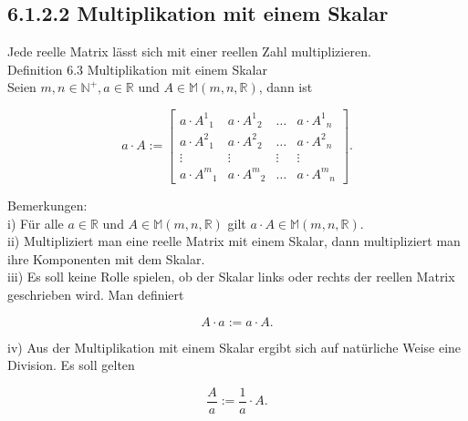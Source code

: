 \documentclass[10pt]{article}
\begin{document}
\subsection*{6.1.2.2 Multiplikation mit einem Skalar}
Jede reelle Matrix lässt sich mit einer reellen Zahl multiplizieren.\\
Definition 6.3 Multiplikation mit einem Skalar\\
Seien $m, n \in \mathbb{N}^{+}, a \in \mathbb{R}$ und $A \in \mathbb{M}(m, n, \mathbb{R})$, dann ist

\[
a \cdot A:=\left[\begin{array}{llll}
a \cdot A^{1}{ }_{1} & a \cdot A^{1}{ }_{2} & \ldots & a \cdot A^{1}{ }_{n}  \tag{6.6}\\
a \cdot A^{2}{ }_{1} & a \cdot A^{2}{ }_{2} & \ldots & a \cdot A^{2}{ }_{n} \\
\vdots & \vdots & \vdots & \vdots \\
a \cdot A^{m}{ }_{1} & a \cdot A^{m}{ }_{2} & \ldots & a \cdot A^{m}{ }_{n}
\end{array}\right] .
\]

Bemerkungen:\\
i) Für alle $a \in \mathbb{R}$ und $A \in \mathbb{M}(m, n, \mathbb{R})$ gilt $a \cdot A \in \mathbb{M}(m, n, \mathbb{R})$.\\
ii) Multipliziert man eine reelle Matrix mit einem Skalar, dann multipliziert man ihre Komponenten mit dem Skalar.\\
iii) Es soll keine Rolle spielen, ob der Skalar links oder rechts der reellen Matrix geschrieben wird. Man definiert


\begin{equation*}
A \cdot a:=a \cdot A . \tag{6.7}
\end{equation*}


iv) Aus der Multiplikation mit einem Skalar ergibt sich auf natürliche Weise eine Division. Es soll gelten


\begin{equation*}
\frac{A}{a}:=\frac{1}{a} \cdot A . \tag{6.8}
\end{equation*}
\end{document}
